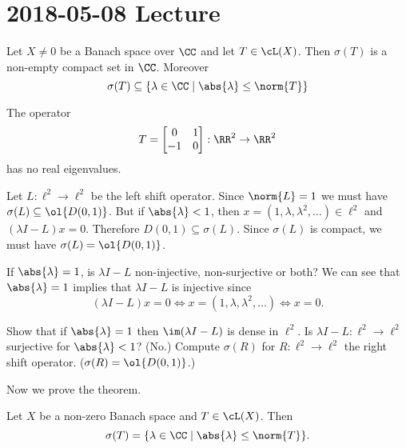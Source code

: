 \section{2018-05-08 Lecture}

\begin{thm}
  Let $X \neq 0$ be a Banach space over $\CC$ and let $T \in \cL(X)$.
  Then $\sigma(T)$ is a non-empty compact set in $\CC$.
  Moreover
  \[ \sigma(T) \subseteq \{ \lambda \in \CC \mid \abs{\lambda} \leq \norm{T} \} \]
\end{thm}

\begin{rmk}
  The operator
  \begin{equation*}
    T=
    \begin{bmatrix}
      0 & 1 \\
      -1 & 0
    \end{bmatrix}
    : \RR^2 \to \RR^2
  \end{equation*}
  has no real eigenvalues.
\end{rmk}

\begin{exam}
  Let $L: \ell^2 \to \ell^2$ be the left shift operator.
  Since $\norm{L} = 1$ we must have $\sigma(L) \subseteq \ol{D(0,1)}$.
  But if $\abs{\lambda}<1$, then $x=(1,\lambda,\lambda^2,\ldots) \in \ell^2$ and $(\lambda I-L)x=0$.
  Therefore $D(0,1) \subseteq \sigma(L)$.
  Since $\sigma(L)$ is compact, we must have $\sigma(L)=\ol{D(0,1)}$.

  If $\abs{\lambda}=1$, is $\lambda I-L$ non-injective, non-surjective or both?
  We can see that $\abs{\lambda}=1$ implies that $\lambda I-L$ is injective since
  \[ (\lambda I-L)x=0 \iff x=(1,\lambda,\lambda^2,\ldots) \iff x=0 .\]
\end{exam}

\begin{exer}
  \leavevmode
  \begin{enum}
    \io Show that if $\abs{\lambda}=1$ then $\im(\lambda I-L)$ is dense in $\ell^2$.
    \io Is $\lambda I-L: \ell^2 \to \ell^2$ surjective for $\abs{\lambda}<1$? (No.)
    \io Compute $\sigma(R)$ for $R: \ell^2 \to \ell^2$ the right shift operator. ($\sigma(R)=\ol{D(0,1)}$.)
  \end{enum}
\end{exer}

Now we prove the theorem.

\begin{prop}
  Let $X$ be a non-zero Banach space and $T \in \cL(X)$.
  Then
  \[ \sigma(T) = \{ \lambda \in \CC \mid \abs{\lambda} \leq \norm{T} \}. \]
\end{prop}

